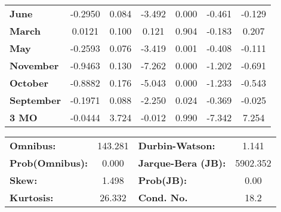 \begin{center}
\begin{tabular}{lcccccc}
\textbf{June}      &      -0.2950  &        0.084     &    -3.492  &         0.000        &       -0.461    &       -0.129     \\
\textbf{March}     &       0.0121  &        0.100     &     0.121  &         0.904        &       -0.183    &        0.207     \\
\textbf{May}       &      -0.2593  &        0.076     &    -3.419  &         0.001        &       -0.408    &       -0.111     \\
\textbf{November}  &      -0.9463  &        0.130     &    -7.262  &         0.000        &       -1.202    &       -0.691     \\
\textbf{October}   &      -0.8882  &        0.176     &    -5.043  &         0.000        &       -1.233    &       -0.543     \\
\textbf{September} &      -0.1971  &        0.088     &    -2.250  &         0.024        &       -0.369    &       -0.025     \\
\textbf{3 MO}      &      -0.0444  &        3.724     &    -0.012  &         0.990        &       -7.342    &        7.254     \\
\bottomrule
\end{tabular}
\begin{tabular}{lclc}
\textbf{Omnibus:}       & 143.281 & \textbf{  Durbin-Watson:     } &    1.141  \\
\textbf{Prob(Omnibus):} &   0.000 & \textbf{  Jarque-Bera (JB):  } & 5902.352  \\
\textbf{Skew:}          &   1.498 & \textbf{  Prob(JB):          } &     0.00  \\
\textbf{Kurtosis:}      &  26.332 & \textbf{  Cond. No.          } &     18.2  \\
\bottomrule
\end{tabular}
\end{center}

